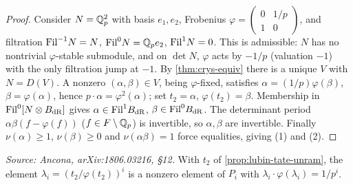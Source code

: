 \begin{proof}
  Consider \(N = \mathbb{Q}_p^2\) with basis \(e_1, e_2\), Frobenius
  \(\varphi = \left(\begin{smallmatrix} 0 & 1/p \\ 1 & 0 \end{smallmatrix}\right)\),
  and filtration \(\mathrm{Fil}^{-1} N = N\), \(\mathrm{Fil}^0 N = \mathbb{Q}_p e_2\), \(\mathrm{Fil}^1 N = 0\).
  This is admissible: \(N\) has no nontrivial \(\varphi\)-stable submodule, and on
  \(\det N\), \(\varphi\) acts by \(-1/p\) (valuation \(-1\)) with the only
  filtration jump at \(-1\). By \cref{thm:crys-equiv} there is a unique \(V\) with
  \(N = D(V)\). A nonzero \((\alpha, \beta) \in V\), being \(\varphi\)-fixed,
  satisfies \(\alpha = (1/p)\varphi(\beta)\), \(\beta = \varphi(\alpha)\), hence
  \(p \cdot \alpha = \varphi^2(\alpha)\); set \(t_2 = \alpha\),
  \(\varphi(t_2) = \beta\). Membership in \(\mathrm{Fil}^0[N \otimes B_{\mathrm{dR}}]\) gives
  \(\alpha \in \mathrm{Fil}^1 B_{\mathrm{dR}}\), \(\beta \in \mathrm{Fil}^0 B_{\mathrm{dR}}\). The determinant period
  \(\alpha\beta(f - \varphi(f))\) (\(f \in F \setminus \mathbb{Q}_p\)) is invertible, so
  \(\alpha, \beta\) are invertible. Finally \(\nu(\alpha) \geq 1\),
  \(\nu(\beta) \geq 0\) and \(\nu(\alpha\beta) = 1\) force equalities, giving (1)
  and (2).
\end{proof}

\begin{corollary}
  \label{cor:period-unram}
  \textit{Source: Ancona, arXiv:1806.03216, \S12.}
  With \(t_2\) of \cref{prop:lubin-tate-unram}, the element
  \(\lambda_i = (t_2/\varphi(t_2))^i\) is a nonzero element of \(P_i\) with
  \(\lambda_i \cdot \varphi(\lambda_i) = 1/p^i\).
\end{corollary}

